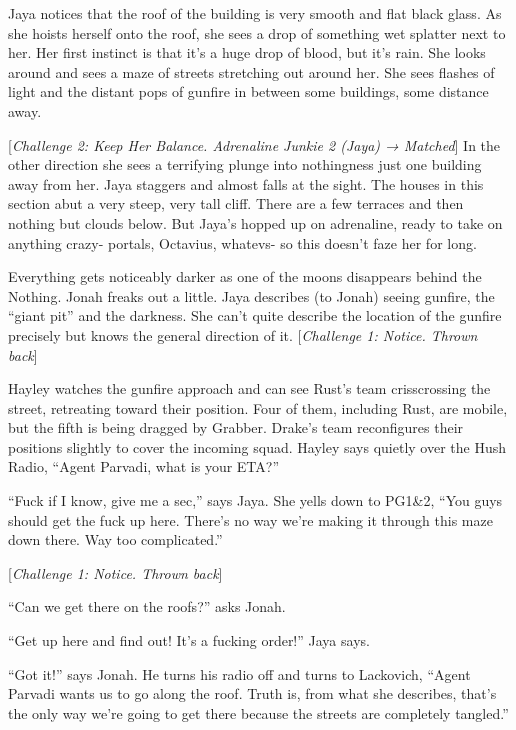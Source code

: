 Jaya notices that the roof of the building is very smooth and flat black glass.  As she hoists herself onto the roof, she sees a drop of something wet splatter next to her.  Her first instinct is that it's a huge drop of blood, but it's rain. She looks around and sees a maze of streets stretching out around her. She sees flashes of light and the distant pops of gunfire in between some buildings, some distance away.

{[}\textit{Challenge 2: Keep Her Balance.  Adrenaline Junkie 2 (Jaya) → Matched}{]}  In the other direction she sees a terrifying plunge into nothingness just one building away from her.  Jaya staggers and almost falls at the sight.  The houses in this section abut a very steep, very tall cliff.  There are a few terraces and then nothing but clouds below.  But Jaya's hopped up on adrenaline, ready to take on anything crazy- portals, Octavius, whatevs- so this doesn't faze her for long.



Everything gets noticeably darker as one of the moons disappears behind the Nothing.  Jonah freaks out a little.  Jaya describes (to Jonah) seeing gunfire, the ``giant pit'' and the darkness.  She can't quite describe the location of the gunfire precisely but knows the general direction of it.  {[}\textit{Challenge 1: Notice.  Thrown back}{]}



Hayley watches the gunfire approach and can see Rust's team crisscrossing the street, retreating toward their position.  Four of them, including Rust, are mobile, but the fifth is being dragged by Grabber.  Drake's team reconfigures their positions slightly to cover the incoming squad.  Hayley says quietly over the Hush Radio, ``Agent Parvadi, what is your ETA?''

``Fuck if I know, give me a sec,'' says Jaya.  She yells down to PG1\&2, ``You guys should get the fuck up here.  There's no way we're making it through this maze down there.  Way too complicated.''

{[}\textit{Challenge 1: Notice.  Thrown back}{]}  

``Can we get there on the roofs?'' asks Jonah.

``Get up here and find out!  It's a fucking order!'' Jaya says.

``Got it!'' says Jonah.  He turns his radio off and turns to Lackovich, ``Agent Parvadi wants us to go along the roof.  Truth is, from what she describes, that's the only way we're going to get there because the streets are completely tangled.''

